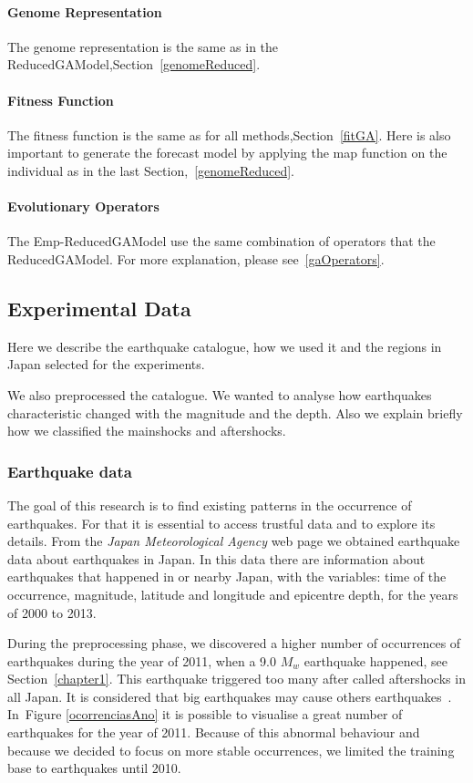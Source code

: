 \paragraph{Genome Representation}
The genome representation is the same as in the ReducedGAModel,Section~\ref{genomeReduced}. 

\paragraph{Fitness Function}
The fitness function is the same as for all methods,Section~\ref{fitGA}. Here is also important to generate the forecast model by applying the map function on the individual as in the last Section,~\ref{genomeReduced}.

\paragraph{Evolutionary Operators}
The Emp-ReducedGAModel use the same combination of operators that the ReducedGAModel. For more explanation, please see~\ref{gaOperators}.


\subsection{Experimental Data}
Here we describe the earthquake catalogue, how we used it and the regions in Japan selected for the experiments.

We also preprocessed the catalogue. We wanted to analyse how earthquakes characteristic changed with the magnitude and the depth. Also we explain briefly how we classified the mainshocks and aftershocks.

\subsubsection{Earthquake data}
The goal of this research is to find existing patterns in the occurrence of earthquakes. For that it is essential to access trustful data and to explore its details. From the  {\it Japan Meteorological Agency} web page we obtained earthquake data about earthquakes in Japan. In this data there are information about earthquakes that happened in or nearby Japan,  with the variables: time of the occurrence, magnitude, latitude and longitude and epicentre depth, for the years of 2000 to 2013.

During the preprocessing phase, we discovered a higher number of occurrences of earthquakes during the year of 2011, when a 9.0 $M_w$ earthquake happened, see Section~\ref{chapter1}. This earthquake triggered too many after called aftershocks in all Japan. It is considered that big earthquakes may cause others earthquakes~\cite{zhuang2004analyzing}. In~Figure \ref{ocorrenciasAno} it is possible to visualise a great number of earthquakes for the year of 2011. Because of this abnormal behaviour and because we decided to focus on more stable occurrences, we limited the training base to earthquakes until 2010.

